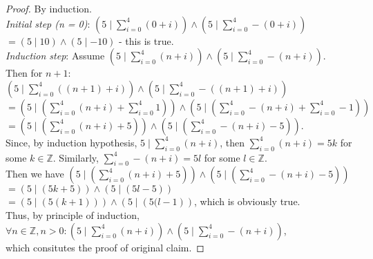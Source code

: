 \documentclass[11pt]{article}
\begin{document}
   \begin{proof}
   By induction. \\
   \emph{Initial step (n = 0)}: $\displaystyle \left( 5 \mid \sum_{i = 0}^{4}\left(0 + i\right) \right) \land \left( 5 \mid \sum_{i = 0}^{4}-\left(0 + i\right) \right)$ \\
   $\displaystyle = \left( 5 \mid 10 \right) \land \left( 5 \mid -10 \right)$ - this is true.\\
   \emph{Induction step}: Assume $\displaystyle \left( 5 \mid \sum_{i = 0}^{4}\left(n + i\right) \right) \land \left( 5 \mid \sum_{i = 0}^{4}-(n + i) \right)$. \\
   Then for $n + 1$:\\
   $\displaystyle \left( 5 \mid \sum_{i = 0}^{4}\left(\left(n + 1\right) + i\right) \right) \land \left( 5 \mid \sum_{i = 0}^{4}-\left(\left(n + 1\right) + i\right) \right)$ \\
   $\displaystyle = \left( 5 \mid \left( \sum_{i = 0}^{4}\left(n + i\right) +  \sum_{i = 0}^{4}1 \right) \right) \land \left( 5 \mid \left( \sum_{i = 0}^{4}-\left(n + i\right) + \sum_{i = 0}^{4}-1 \right) \right)$ \\
   $\displaystyle = \left( 5 \mid \left( \sum_{i = 0}^{4}\left(n + i\right) +  5 \right) \right) \land \left( 5 \mid \left( \sum_{i = 0}^{4}-\left(n + i\right) - 5 \right) \right)$. \\
   Since, by induction hypothesis, $\displaystyle 5 \mid \sum_{i = 0}^{4}\left(n + i\right)$, then $\displaystyle \sum_{i = 0}^{4}\left(n + i\right) = 5k $ for some $k \in \mathbb{Z}$.
   Similarly, $\displaystyle \sum_{i = 0}^{4}-\left(n + i\right) = 5l $ for some $l \in \mathbb{Z}$. \\
   Then we have
   $\displaystyle \left( 5 \mid \left( \sum_{i = 0}^{4}\left(n + i\right) +  5 \right) \right) \land \left( 5 \mid \left( \sum_{i = 0}^{4}-\left(n + i\right) - 5 \right) \right)$ \\
   $\displaystyle = \left( 5 \mid \left( 5k +  5 \right) \right) \land \left( 5 \mid \left( 5l - 5 \right) \right)$ \\
   $\displaystyle = \left( 5 \mid \left( 5(k +  1) \right) \right) \land \left( 5 \mid \left( 5(l - 1 \right) \right)$, which is obviously true. \\
   Thus, by principle of induction,\\
   $\displaystyle \forall n \in \mathbb{Z}, n > 0: \left( 5 \mid \sum_{i = 0}^{4}\left(n + i\right) \right) \land \left( 5 \mid \sum_{i = 0}^{4}-(n + i) \right)$, \\
   which consitutes the proof of original claim.
   \end{proof}
\end{document}
